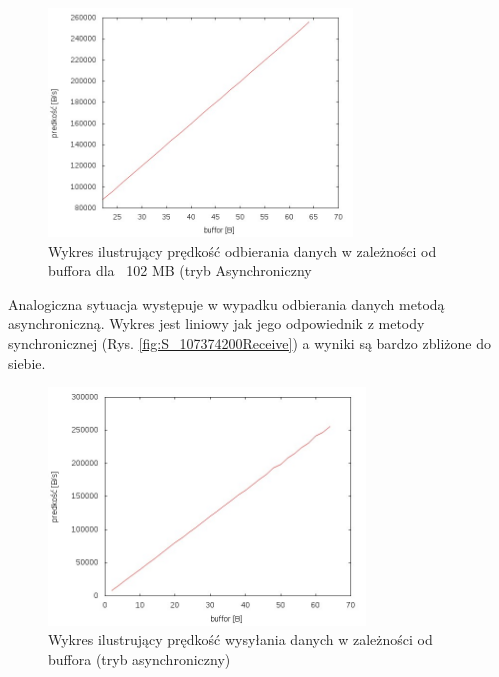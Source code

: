 \documentclass{BscUS}
\begin{document}
\begin{figure}[H]
{
\centering
\includegraphics[width=0.72\textwidth]{./img/A_107374200Receive}
\caption{Wykres ilustrujący prędkość odbierania danych w zależności od buffora dla ~102 MB (tryb Asynchroniczny}
\label{fig:A_107374200Receive}
}
\end{figure}
\noindent Analogiczna sytuacja występuje w wypadku odbierania danych metodą asynchroniczną. Wykres jest liniowy jak jego odpowiednik z metody synchronicznej (Rys. \ref{fig:S_107374200Receive}) a wyniki są bardzo zbliżone do siebie.




\begin{figure}[H]
{
\centering
\includegraphics[width=0.75\textwidth]{./img/A_10737420Send}
\caption{Wykres ilustrujący prędkość wysyłania danych w zależności od buffora (tryb asynchroniczny)}
\label{fig:A_10737420Send}
}
\end{figure}
\end{document}
